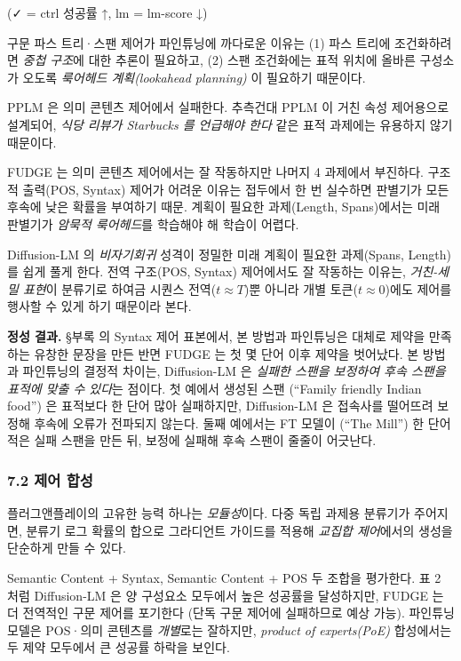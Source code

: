 \documentclass[
]{article}
\begin{document}
(✓ = ctrl 성공률 ↑, lm = lm-score ↓)

구문 파스 트리·스팬 제어가 파인튜닝에 까다로운 이유는 (1) 파스 트리에
조건화하려면 \emph{중첩 구조}에 대한 추론이 필요하고, (2) 스팬
조건화에는 표적 위치에 올바른 구성소가 오도록 \emph{룩어헤드
계획(lookahead planning)} 이 필요하기 때문이다.

PPLM 은 의미 콘텐츠 제어에서 실패한다. 추측건대 PPLM 이 거친 속성
제어용으로 설계되어, \emph{식당 리뷰가 Starbucks 를 언급해야 한다} 같은
표적 과제에는 유용하지 않기 때문이다.

FUDGE 는 의미 콘텐츠 제어에서는 잘 작동하지만 나머지 4 과제에서
부진하다. 구조적 출력(POS, Syntax) 제어가 어려운 이유는 접두에서 한 번
실수하면 판별기가 모든 후속에 낮은 확률을 부여하기 때문. 계획이 필요한
과제(Length, Spans)에서는 미래 판별기가 \emph{암묵적 룩어헤드}를
학습해야 해 학습이 어렵다.

Diffusion-LM 의 \emph{비자기회귀} 성격이 정밀한 미래 계획이 필요한
과제(Spans, Length)를 쉽게 풀게 한다. 전역 구조(POS, Syntax) 제어에서도
잘 작동하는 이유는, \emph{거친-세밀 표현}이 분류기로 하여금 시퀀스
전역(\(t \approx T\))뿐 아니라 개별 토큰(\(t \approx 0\))에도 제어를
행사할 수 있게 하기 때문이라 본다.

\textbf{정성 결과.} §부록 의 Syntax 제어 표본에서, 본 방법과 파인튜닝은
대체로 제약을 만족하는 유창한 문장을 만든 반면 FUDGE 는 첫 몇 단어 이후
제약을 벗어났다. 본 방법과 파인튜닝의 결정적 차이는, Diffusion-LM 은
\emph{실패한 스팬을 보정하여 후속 스팬을 표적에 맞출 수 있다}는 점이다.
첫 예에서 생성된 스팬 (``Family friendly Indian food'') 은 표적보다 한
단어 많아 실패하지만, Diffusion-LM 은 접속사를 떨어뜨려 보정해 후속에
오류가 전파되지 않는다. 둘째 예에서는 FT 모델이 (``The Mill'') 한 단어
적은 실패 스팬을 만든 뒤, 보정에 실패해 후속 스팬이 줄줄이 어긋난다.

\hypertarget{uxc81cuxc5b4-uxd569uxc131}{%
\subsubsection{7.2 제어 합성}\label{uxc81cuxc5b4-uxd569uxc131}}

플러그앤플레이의 고유한 능력 하나는 \emph{모듈성}이다. 다중 독립 과제용
분류기가 주어지면, 분류기 로그 확률의 합으로 그라디언트 가이드를 적용해
\emph{교집합 제어}에서의 생성을 단순하게 만들 수 있다.

Semantic Content + Syntax, Semantic Content + POS 두 조합을 평가한다. 표
2 처럼 Diffusion-LM 은 양 구성요소 모두에서 높은 성공률을 달성하지만,
FUDGE 는 더 전역적인 구문 제어를 포기한다 (단독 구문 제어에 실패하므로
예상 가능). 파인튜닝 모델은 POS·의미 콘텐츠를 \emph{개별}로는 잘하지만,
\emph{product of experts(PoE)} 합성에서는 두 제약 모두에서 큰 성공률
하락을 보인다.
\end{document}
